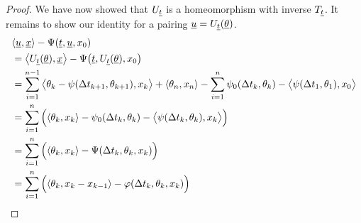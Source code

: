 \begin{proof}
  We have now showed that $U_{\underline t}$ is a homeomorphism with inverse $T_{\underline t}$.
  It remains to show our identity for a pairing $\underline{u} = U_{\underline t}(\underline{\theta})$.
  \begin{align*}
    &{\langle \underline{u} , \underline{x} \rangle} - \Psi(\underline t, \underline{u}, x_0) \\
    &= {\big\langle U_{\underline t}(\underline{\theta}) , \underline{x} \big\rangle} - \Psi\big(\underline t, U_{\underline t}(\underline{\theta}), x_0\big) \\
    &= \sum_{i=1}^{n-1} {\big\langle \theta_k - \psi(\Delta t_{k+1}, \theta_{k+1}) , x_k \big\rangle} + {\langle \theta_n , x_n \rangle} - \sum_{i=1}^n \psi_0(\Delta t_k, \theta_k) - {\big\langle \psi(\Delta t_1, \theta_1) , x_0 \big\rangle}  \\
    &= \sum_{i=1}^n \Big( {\langle \theta_k , x_k \rangle} - \psi_0(\Delta t_k, \theta_k) - {\big\langle \psi(\Delta t_k, \theta_k) , x_k \big\rangle} \Big) \\
    &= \sum_{i=1}^n \Big( {\langle \theta_k , x_k \rangle} - \Psi(\Delta t_k, \theta_k, x_k) \Big) \\
    &= \sum_{i=1}^n \Big( {\langle \theta_k , x_k-x_{k-1} \rangle} - \varphi(\Delta t_k, \theta_k, x_k) \Big)
  \end{align*}
\end{proof}
